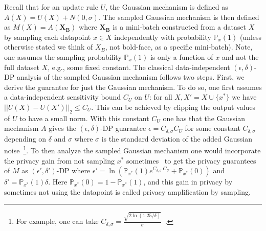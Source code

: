 Recall that for an update rule $U$, the Gaussian mechanism is defined as $A(X) = U(X) + N(0,\sigma)$. The sampled Gaussian mechanism is then defined as $M(X) = A(\mathbf{X_B})$ where $\mathbf{X_B}$ is a mini-batch constructed from a dataset $X$ by sampling each datapoint $x \in X$ independently with probability $\mathbb{P}_{x}(1)$ (unless otherwise stated we think of $X_B$, not bold-face, as a specific mini-batch). Note, one assumes the sampling probability $\mathbb{P}_{x}(1)$ is only a function of $x$ and not the full dataset $X$, e.g., some fixed constant. The classical data-independent $(\epsilon,\delta)$-DP analysis of the sampled Gaussian mechanism follows two steps. First, we derive the guarantee for just the Gaussian mechanism. To do so, one first assumes a data-independent sensitivity bound $C_U$ on $U$: for all $X,X' = X \cup \{x^*\}$ we have $||U(X) - U(X')||_{2} \leq C_{U}$. This can be achieved by clipping the output values of $U$ to have a small norm. With this constant $C_U$ one has that the Gaussian mechanism $A$ gives the $(\epsilon,\delta)$-DP guarantee $\epsilon = C_{\delta,\sigma} C_U$ for some constant $C_{\delta,\sigma}$ depending on $\delta$ and $\sigma$ where $\sigma$ is the standard deviation of the added Gaussian noise~\footnote{For example, one can take $C_{\delta, \sigma} = \frac{\sqrt{2 \ln (1.25/\delta)}}{\sigma}$~\citep{dwork2014algorithmic}.}. To then analyze the sampled Gaussian mechanism one would incorporate the privacy gain from not sampling $x^*$ sometimes~\citep{beimel2014bounds}\citep{kasiviswanathan2011can} to get the privacy guarantees of $M$ %
as $(\epsilon',\delta')$-DP where $\epsilon' = \ln( \mathbb{P}_{x^*}(1) e^{C_{\delta,\sigma}~C_U} + \mathbb{P}_{x^*}(0))$ and $\delta' = \mathbb{P}_{x^*}(1) \delta$. Here $\mathbb{P}_{x^*}(0)=1-\mathbb{P}_{x^*}(1)$, and this gain in privacy by sometimes not using the datapoint is called privacy amplification by sampling.






